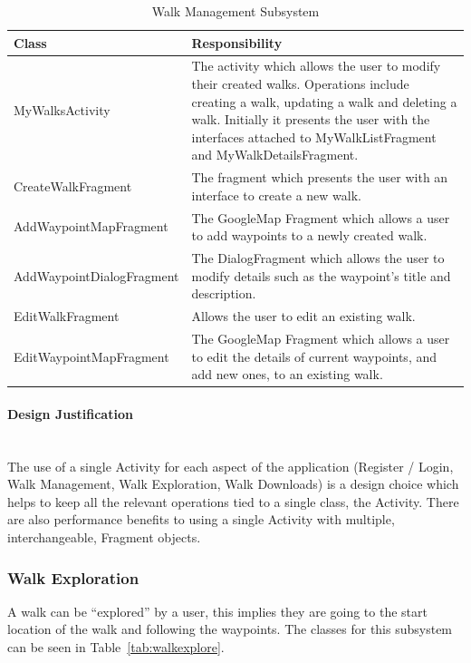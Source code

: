 \documentclass[11pt,a4paper]{report}
\begin{document}
\begin{longtable}{|p{5cm}|p{10cm}|}
\hline \caption{Walk Management Subsystem - Cont. on Next Page.} \endfoot
\hline \caption{Walk Management Subsystem} \label{tab:walkcreate} \endlastfoot
\hline
\textbf{Class} & \textbf{Responsibility} \\ \hline
MyWalksActivity & The activity which allows the user to modify their created walks. Operations include creating a walk, updating a walk and deleting a walk. Initially it presents the user with the interfaces attached to MyWalkListFragment and MyWalkDetailsFragment. \\ \hline
CreateWalkFragment & The fragment which presents the user with an interface to create a new walk. \\ \hline
AddWaypointMapFragment & The GoogleMap Fragment which allows a user to add waypoints to a newly created walk. \\ \hline
AddWaypointDialogFragment & The DialogFragment which allows the user to modify details such as the waypoint's title and description. \\ \hline
EditWalkFragment & Allows the user to edit an existing walk. \\ \hline
EditWaypointMapFragment & The GoogleMap Fragment which allows a user to edit the details of current waypoints, and add new ones, to an existing walk. \\ \hline
\end{longtable}

\paragraph*{Design Justification}\mbox{}\\ 
The use of a single Activity for each aspect of the application (Register / Login, Walk Management, Walk Exploration, Walk Downloads) is a design choice which helps to keep all the relevant operations tied to a single class, the Activity. There are also performance benefits to using a single Activity with multiple, interchangeable, Fragment objects.

\subsubsection{Walk Exploration}
\label{sec:walkexplore}
A walk can be ``explored'' by a user, this implies they are going to the start location of the walk and following the waypoints. The classes for this subsystem can be seen in Table~\ref{tab:walkexplore}.
\end{document}

